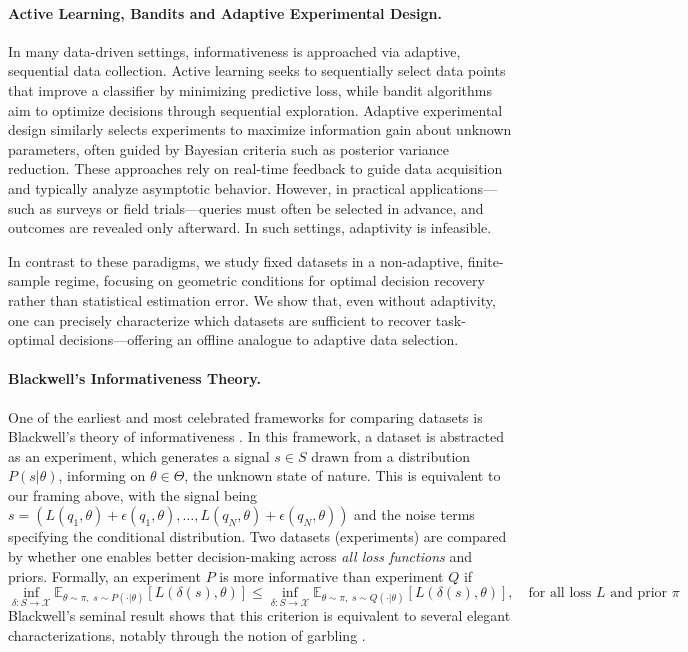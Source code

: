 \documentclass[11pt]{article}
\theoremstyle{plain}
\theoremstyle{definition}
\newcommand{\Eb}{\mathbb{E}}
\newcommand{\cX}{\mathcal{X}}
\begin{document}
\paragraph{Active Learning, Bandits and Adaptive Experimental Design.} 
In many data-driven settings, informativeness is approached via adaptive, sequential data collection. Active learning \citep{settlesActiveLearningLiterature2009} seeks to sequentially select data points that improve a classifier by minimizing predictive loss, while bandit algorithms \citep{lattimoreBanditAlgorithms2020} aim to optimize decisions through sequential exploration. Adaptive experimental design \citep{zhaoExperimentalDesign2024a} similarly selects experiments to maximize information gain about unknown parameters, often guided by Bayesian criteria such as posterior variance reduction. These approaches rely on real-time feedback to guide data acquisition and typically analyze asymptotic behavior. However, in practical applications---such as surveys or field trials---queries must often be selected in advance, and outcomes are revealed only afterward. In such settings, adaptivity is infeasible. 

In contrast to these paradigms, we study fixed datasets in a non-adaptive, finite-sample regime, focusing on geometric conditions for optimal decision recovery rather than statistical estimation error. We show that, even without adaptivity, one can precisely characterize which datasets are sufficient to recover task-optimal decisions---offering an offline analogue to adaptive data selection. 

\paragraph{Blackwell's Informativeness Theory.}
One of the earliest and most celebrated frameworks for comparing datasets is Blackwell's theory of informativeness \citep{blackwellEquivalentComparisonsExperiments1953}. In this framework, a dataset is abstracted as an experiment, which generates a signal $s \in S$ drawn from a distribution \(P(s|\theta)\), informing on $\theta \in \Theta$, the unknown state of nature. This is equivalent to our framing above, with the signal being $s = (L(q_1,\theta) + \epsilon(q_1,\theta), \ldots, L(q_N,\theta) + \epsilon(q_N,\theta))$ and the noise terms specifying the conditional distribution. Two datasets (experiments) are compared by whether one enables better decision-making across \emph{all loss functions} and priors. Formally, an experiment \(P\) is more informative than experiment \(Q\) if
$$
\inf_{\delta:S \to \cX} \Eb_{\theta \sim \pi,\; s \sim P(\cdot|\theta)}[L(\delta(s),\theta)] 
\leq 
\inf_{\delta:S \to \cX} \Eb_{\theta \sim \pi,\; s \sim Q(\cdot|\theta)}[L(\delta(s),\theta)], \quad \text{for all loss $L$ and prior $\pi$}
$$
Blackwell's seminal result shows that this criterion is equivalent to several elegant characterizations, notably through the notion of garbling \citep{deoliveiraBlackwellsinformativeness2018}.
\end{document}
